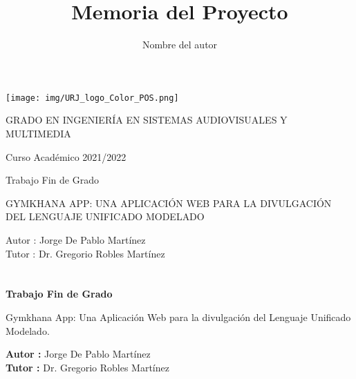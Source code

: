 \documentclass[a4paper, 12pt]{book}
\title{Memoria del Proyecto}
\author{Nombre del autor}
\begin{document}
\renewcommand{\refname}{Bibliografía}  %
\renewcommand{\appendixname}{Apéndice}


\begin{titlepage}
\begin{center}
\texttt{[image: img/URJ\_logo\_Color\_POS.png]}

\vspace{1.75cm}

\Large
GRADO EN INGENIERÍA EN SISTEMAS AUDIOVISUALES Y MULTIMEDIA

\vspace{0.4cm}

\large
Curso Académico 2021/2022

\vspace{0.8cm}

Trabajo Fin de Grado

\vspace{2.5cm}

\LARGE
GYMKHANA APP: UNA APLICACIÓN WEB PARA LA DIVULGACIÓN DEL LENGUAJE UNIFICADO MODELADO

\vspace{4cm}

\large
Autor : Jorge De Pablo Martínez \\
Tutor : Dr. Gregorio Robles Martínez
\end{center}
\end{titlepage}

\newpage
\mbox{}
\thispagestyle{empty} 


\clearpage
{}
\chapter*{}

\vspace{-4cm}
\begin{center}
\LARGE
\textbf{Trabajo Fin de Grado}

\vspace{1cm}
\large
Gymkhana App: Una Aplicación Web para la divulgación del Lenguaje Unificado Modelado. 

\vspace{1cm}
\large
\textbf{Autor :} Jorge De Pablo Martínez \\
\textbf{Tutor :} Dr. Gregorio Robles Martínez

\end{center}
\end{document}
